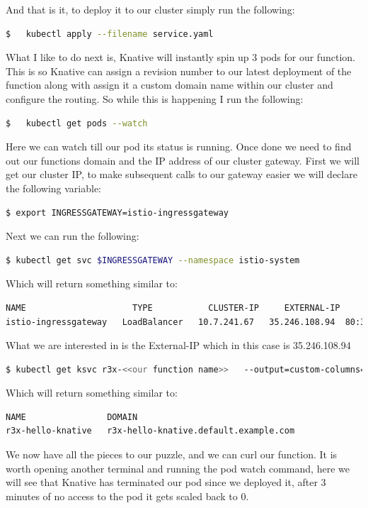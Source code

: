 And that is it, to deploy it to our cluster simply run the following:
\begin{lstlisting}[language=bash]
  $   kubectl apply --filename service.yaml
\end{lstlisting}
What I like to do next is, Knative will instantly spin up 3 pods for our function. This is so Knative can assign a revision number to our latest deployment of the function along with assign it a custom domain name within our cluster and configure the routing. So while this is happening I run the following:
\begin{lstlisting}[language=bash]
  $   kubectl get pods --watch
\end{lstlisting}
Here we can watch till our pod its status is running. Once done we need to find out our functions domain and the IP address of our cluster gateway. First we will get our cluster IP, to make subsequent calls to our gateway easier we will declare the following variable:
\begin{lstlisting}[language=bash]
$ export INGRESSGATEWAY=istio-ingressgateway
\end{lstlisting}
Next we can run the following:
\begin{lstlisting}[language=bash]
$ kubectl get svc $INGRESSGATEWAY --namespace istio-system
\end{lstlisting}
Which will return something similar to:
\begin{lstlisting}[language=bash]
NAME                     TYPE           CLUSTER-IP     EXTERNAL-IP      PORT(S)                                      AGE
istio-ingressgateway   LoadBalancer   10.7.241.67   35.246.108.94  80:31380/TCP,443:31390/TCP,31400:31400/TCP,15011:30271/TCP,8060:31049/TCP,853:32614/TCP,15030:30885/TCP,15031:32329/TCP   55m
\end{lstlisting}
What we are interested in is the External-IP which in this case is 35.246.108.94
\begin{lstlisting}[language=bash]
$ kubectl get ksvc r3x-<<our function name>>   --output=custom-columns=NAME:.metadata.name,DOMAIN:.status.domain
\end{lstlisting}
Which will return something similar to:
\begin{lstlisting}[language=bash]
NAME                DOMAIN
r3x-hello-knative   r3x-hello-knative.default.example.com
\end{lstlisting}
We now have all the pieces to our puzzle, and we can curl our function. It is worth opening another terminal and running the pod watch command, here we will see that Knative has terminated our pod since we deployed it, after 3 minutes of no access to the pod it gets scaled back to 0. 
